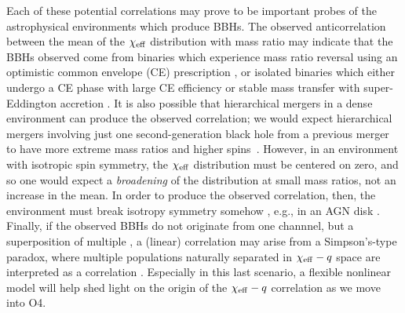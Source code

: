 \documentclass[%
 reprint,
 amsmath,amssymb,
 aps,
 prd,
]{revtex4-2}
\newcommand{\chieff}{\chi_{\rm eff}}
\begin{document}

Each of these potential correlations may prove to be important probes of the astrophysical environments which produce BBHs. The observed anticorrelation between the mean of the $\chieff$ distribution with mass ratio may indicate that the BBHs observed come from binaries which experience mass ratio reversal using an optimistic common envelope (CE) prescription \cite{Broekgaarden:2022nst}, or isolated binaries which either undergo a CE phase with large CE efficiency or stable mass transfer with super-Eddington accretion \cite{Bavera:2020uch, Zevin:2022wrw}. It is also possible that hierarchical mergers in a dense environment can produce the observed correlation; we would expect hierarchical mergers involving just one second-generation black hole from a previous merger to have more extreme mass ratios and higher spins~\cite[e.g.,][]{Gerosa:2021mno}. However, in an environment with isotropic spin symmetry, the $\chieff$ distribution must be centered on zero, and so one would expect a \textit{broadening} of the distribution at small mass ratios, not an increase in the mean. In order to produce the observed correlation, then, the environment must break isotropy symmetry somehow \cite{Santini:2023ukl}, e.g., in an AGN disk \cite{McKernan:2021nwk, Santini:2023ukl}. Finally, if the observed BBHs do not originate from one channnel, but a superposition of multiple \cite[e.g.,][]{Zevin:2020gbd,Cheng:2023ddt}, a (linear) correlation may arise from a Simpson's-type paradox, where multiple populations naturally separated in $\chieff-q$ space are %
interpreted as a correlation \cite{Baibhav:2022qxm}. Especially in this last scenario, a flexible nonlinear model will help shed light on the origin of the $\chieff-q$ correlation as we move into O4. 
\end{document}
